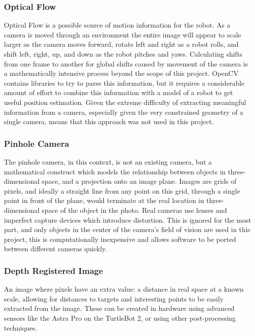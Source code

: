 \documentclass{article}[12]
\begin{document}
		\subsubsection{Optical Flow}
		
		Optical Flow is a possible source of motion information for the robot. As a camera is moved through an environment the entire image will appear to scale larger as the camera moves forward, rotate left and right as a robot rolls, and shift left, right, up, and down as the robot pitches and yaws. Calculating shifts from one frame to another for global shifts caused by movement of the camera is a mathematically intensive process beyond the scope of this project. OpenCV contains libraries to try to parse this information, but it requires a considerable amount of effort to combine this information with a model of a robot to get useful position estimation. Given the extreme difficulty of extracting meaningful information from a camera, especially given the very constrained geometry of a single camera, means that this approach was not used in this project.
		
		\subsubsection{Pinhole Camera}
		
		The pinhole camera, in this context, is not an existing camera, but a mathematical construct which models the relationship between objects in three-dimensional space, and a projection onto an image plane. Images are grids of pixels, and ideally a straight line from any point on this grid, through a single point in front of the plane, would terminate at the real location in three-dimensional space of the object in the photo. Real cameras use lenses and imperfect capture devices which introduce distortion. This is ignored for the most part, and only objects in the center of the camera's field of vision are used in this project, this is computationally inexpensive and allows software to be ported between different cameras quickly. 
		
		\subsubsection{Depth Registered Image}
		
		An image where pixels have an extra value: a distance in real space at a known scale, allowing for distances to targets and interesting points to be easily extracted from the image. These can be created in hardware using advanced sensors like the Astra Pro on the TurtleBot 2, or using other post-processing techniques.
		
\end{document}
